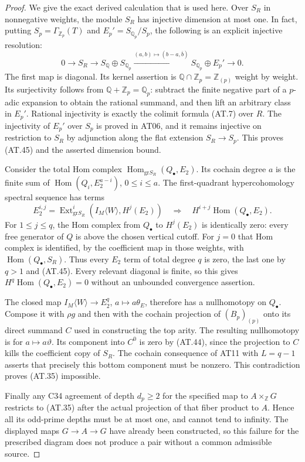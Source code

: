 \begin{proof}
We give the exact derived calculation that is
used here.  Over $S_R$ in nonnegative weights,
the module $S_R$ has injective dimension at most
one.  In fact, putting $S_p=\Gamma_{\mathbb Z_p}(T)$
and $E_p'=S_{\mathbb Q_p}/S_p$, the following is
an explicit injective resolution:
\[
 0\longrightarrow S_R\longrightarrow
 S_{\mathbb Q}\oplus S_{\mathbb Q_p}
 \xrightarrow{(a,b)\mapsto(b-a,\overline b)}
 S_{\mathbb Q_p}\oplus E_p'\longrightarrow0.
 \tag{AT.45}
\]
The first map is diagonal.  Its kernel assertion
is $\mathbb Q\cap\mathbb Z_p=\mathbb Z_{(p)}$
weight by weight.  Its surjectivity follows from
$\mathbb Q+\mathbb Z_p=\mathbb Q_p$: subtract the
finite negative part of a $p$-adic expansion to
obtain the rational summand, and then lift an
arbitrary class in $E_p'$.  Rational injectivity
is exactly the colimit formula \textup{(AT.7)}
over $R$.  The injectivity of $E_p'$ over $S_p$
is proved in AT06, and it remains injective on
restriction to $S_R$ by adjunction along the flat
extension $S_R\to S_p$.  This proves
\textup{(AT.45)} and the asserted dimension bound.

Consider the total Hom complex
$\operatorname{Hom}_{\mathrm{gr}S_R}(Q_\bullet,E_2)$.
Its cochain degree $a$ is the finite sum of
$\operatorname{Hom}(Q_i,E_2^{a-i})$, $0\leq i\leq a$.
The first-quadrant hypercohomology spectral sequence
has terms
\[
 E_2^{i,j}=\operatorname{Ext}^i_{\mathrm{gr}S_R}
           (I_M\langle W\rangle,H^j(E_2))
 \quad\Longrightarrow\quad
 H^{i+j}\operatorname{Hom}(Q_\bullet,E_2).
 \tag{AT.46}
\]
For $1\leq j\leq q$, the Hom complex from $Q_\bullet$
to $H^j(E_2)$ is identically zero: every free
generator of $Q$ is above the chosen vertical
cutoff.  For $j=0$ that Hom complex is identified,
by the coefficient map in those weights, with
$\operatorname{Hom}(Q_\bullet,S_R)$.
Thus every $E_2$ term of total degree $q$ is zero,
the last one by $q>1$ and \textup{(AT.45)}.
Every relevant diagonal is finite, so this gives
$H^q\operatorname{Hom}(Q_\bullet,E_2)=0$ without
an unbounded convergence assertion.

The closed map
$I_M\langle W\rangle\to E_2^q$, $a\mapsto a\theta_E$,
therefore has a nullhomotopy on $Q_\bullet$.
Compose it with $\rho g$ and then with the cochain
projection of $(B_p)_{(p)}$ onto its direct summand
$C$ used in constructing the top arity.
The resulting nullhomotopy is for
$a\mapsto a\vartheta$.  Its component into $C^0$
is zero by \textup{(AT.44)}, since the projection
to $C$ kills the coefficient copy of $S_R$.
The cochain consequence of AT11 with $L=q-1$
asserts that precisely this bottom component must
be nonzero.  This contradiction proves
\textup{(AT.35)} impossible.

Finally any C34 agreement of depth $d_p\geq2$
for the specified map to $A\times_{\mathbb Z}G$
restricts to \textup{(AT.35)} after the actual
projection of that fiber product to $A$.
Hence all its odd-prime depths must be at most one,
and cannot tend to infinity.  The displayed maps
$G\to A\to G$ have already been constructed, so
this failure for the prescribed diagram does not
produce a pair without a common admissible source.
\end{proof}
